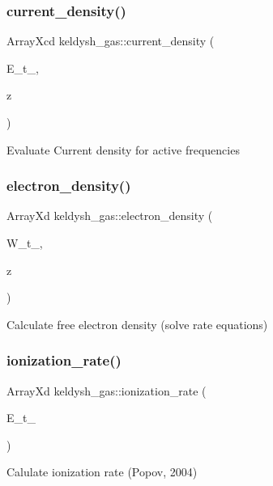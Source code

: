 \subsubsection{\texorpdfstring{current\+\_\+density()}{current\_density()}}
{\footnotesize\ttfamily Array\+Xcd keldysh\+\_\+gas\+::current\+\_\+density (\begin{DoxyParamCaption}\item[{Array\+Xd}]{E\+\_\+t\+\_\+,  }\item[{double}]{z }\end{DoxyParamCaption})}

Evaluate Current density for active frequencies \mbox{\label{classkeldysh__gas_a8dddacdfabea4d6c3049088cc868715a}} 
\subsubsection{\texorpdfstring{electron\+\_\+density()}{electron\_density()}}
{\footnotesize\ttfamily Array\+Xd keldysh\+\_\+gas\+::electron\+\_\+density (\begin{DoxyParamCaption}\item[{Array\+Xd}]{W\+\_\+t\+\_\+,  }\item[{double}]{z }\end{DoxyParamCaption})}

Calculate free electron density (solve rate equations) \mbox{\label{classkeldysh__gas_a42dc79816adcae9c25499baa7256ec10}} 
\subsubsection{\texorpdfstring{ionization\+\_\+rate()}{ionization\_rate()}}
{\footnotesize\ttfamily Array\+Xd keldysh\+\_\+gas\+::ionization\+\_\+rate (\begin{DoxyParamCaption}\item[{Array\+Xd}]{E\+\_\+t\+\_\+ }\end{DoxyParamCaption})}

Calulate ionization rate (Popov, 2004) \mbox{\label{classkeldysh__gas_a1cd65d1983cb6c5ff9d04eeb29e94dd5}} 
